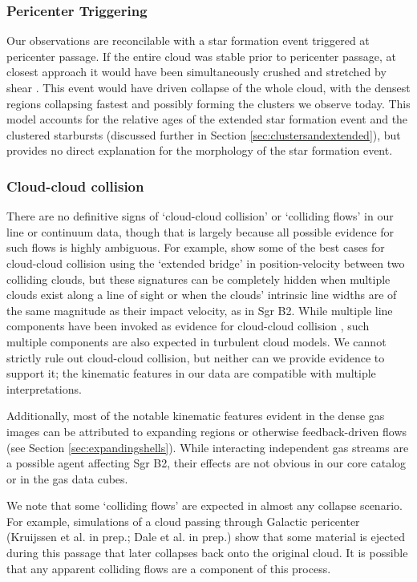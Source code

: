 \documentclass[twocolumn]{aastex61}
\begin{document}
\subsubsection{Pericenter Triggering}
Our observations are reconcilable with a star formation event triggered
at pericenter passage.  If the entire cloud was stable prior to pericenter
passage, at closest approach it would have been simultaneously crushed and
stretched by shear \citep{Kruijssen2015a}.  This event would have driven
collapse of the whole cloud, with the densest regions collapsing fastest and
possibly forming the clusters we observe today.  This model accounts for the
relative ages of the extended star formation event and the clustered starbursts
(discussed further in Section \ref{sec:clustersandextended}), but provides no
direct explanation for the morphology of the star formation event.

\subsubsection{Cloud-cloud collision}
There are no definitive signs of `cloud-cloud collision' or `colliding flows'
in our line or continuum data, though that is largely because all possible
evidence for such flows is highly ambiguous. For example, \citet{Haworth2015c}
show some of the best cases for cloud-cloud collision using the `extended bridge'
in position-velocity between two colliding clouds, but these signatures can be 
completely hidden when multiple clouds exist along a line of sight or when
the clouds' intrinsic line widths are of the same magnitude as their impact velocity,
as in Sgr B2.  While multiple line components have been invoked as evidence
for cloud-cloud collision \citep{Hasegawa1994a,Corby2015a}, such multiple
components are also expected in turbulent cloud models.
We cannot strictly rule out cloud-cloud collision, but neither
can we provide evidence to support it; the kinematic features in our data are
compatible with multiple interpretations.

Additionally, most of the notable kinematic features evident in the dense gas
images can be attributed to expanding \hii regions or otherwise feedback-driven
flows (see Section \ref{sec:expandingshells}).  While interacting independent
gas streams are a possible agent affecting Sgr B2, their effects are not
obvious in our core catalog or in the gas data cubes.

We note that some `colliding flows' are expected in almost any collapse
scenario.  For example, simulations of a cloud passing through Galactic
pericenter (Kruijssen et al. in prep.; Dale et al. in prep.) show that some
material is ejected during this passage that later collapses back onto the
original cloud.  It is possible that any apparent colliding flows
\citep[e.g.][]{Sato2000a} are a component of this process.
\end{document}
